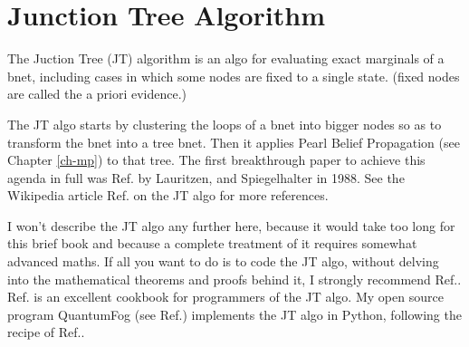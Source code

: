 \chapter{Junction Tree Algorithm}
\label{ch-junc-tree}
The Juction Tree (JT)
algorithm
is an algo
for evaluating
exact marginals
of a bnet, 
including cases in which
some nodes are fixed to a single state.
(fixed nodes
are called the a priori evidence.)

The JT algo
starts by  
clustering
the loops of a bnet into bigger nodes
so as  to
transform the bnet into a tree bnet.
Then it applies
Pearl Belief Propagation (see
Chapter \ref{ch-mp}) to that tree.
The first breakthrough 
paper to achieve this agenda in full
was Ref.\cite{lauritzen1988}
by Lauritzen, and Spiegelhalter in 1988.
See the Wikipedia article 
Ref.\cite{wiki-junc-tree}
on the JT algo for more
 references. 

I won't describe
the JT algo
any further here,
because it would take too
long for this brief book
and because a 
complete treatment
of it
requires somewhat  advanced
maths.
If all you want to do is to
code the JT algo, without
delving into the mathematical theorems
and proofs behind it, I 
strongly recommend 
Ref.\cite{huang1996}.
Ref.\cite{huang1996} is 
an excellent cookbook
for programmers of the JT algo. My
open source  
program QuantumFog (see Ref.\cite{qfog})
implements the
JT algo in Python, 
following the recipe of
Ref.\cite{huang1996}.